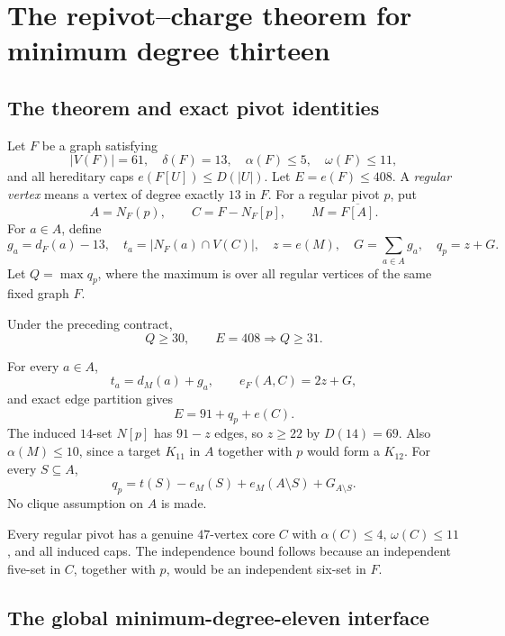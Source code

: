 \section{The repivot--charge theorem for minimum degree thirteen}
\label{sec:cover}

\subsection{The theorem and exact pivot identities}

Let $F$ be a graph satisfying
\[
|V(F)|=61,\quad \delta(F)=13,\quad
\alpha(F)\leq5,\quad\omega(F)\leq11,
\]
and all hereditary caps $e(F[U])\leq D(|U|)$. Let $E=e(F)\leq408$. A \emph{regular vertex} means a vertex of degree exactly $13$ in $F$. For a regular pivot $p$, put
\[
A=N_F(p),\qquad C=F-N_F[p],\qquad M=\overline{F[A]}.
\]
For $a\in A$, define
\[
g_a=d_F(a)-13,\quad t_a=|N_F(a)\cap V(C)|,\quad
z=e(M),\quad G=\sum_{a\in A}g_a,\quad q_p=z+G.
\]
Let $Q=\max q_p$, where the maximum is over all regular vertices of the same fixed graph $F$.

\begin{theorem}[COVER]
\label{thm:COVER}
Under the preceding contract,
\[
Q\geq30,\qquad
E=408\Longrightarrow Q\geq31.
\]
\end{theorem}

For every $a\in A$,
\[
t_a=d_M(a)+g_a,\qquad e_F(A,C)=2z+G,
\]
and exact edge partition gives
\begin{equation}
E=91+q_p+e(C).
\label{eq:charge-energy}
\end{equation}
The induced $14$-set $N[p]$ has $91-z$ edges, so $z\geq22$ by $D(14)=69$. Also $\alpha(M)\leq10$, since a target $K_{11}$ in $A$ together with $p$ would form a $K_{12}$. For every $S\subseteq A$,
\begin{equation}
q_p=t(S)-e_M(S)+e_M(A\setminus S)+G_{A\setminus S}.
\label{eq:charge-subset}
\end{equation}
No clique assumption on $A$ is made.

Every regular pivot has a genuine $47$-vertex core $C$ with $\alpha(C)\leq4$, $\omega(C)\leq11$, and all induced caps. The independence bound follows because an independent five-set in $C$, together with $p$, would be an independent six-set in $F$.

\subsection{The global minimum-degree-eleven interface}


